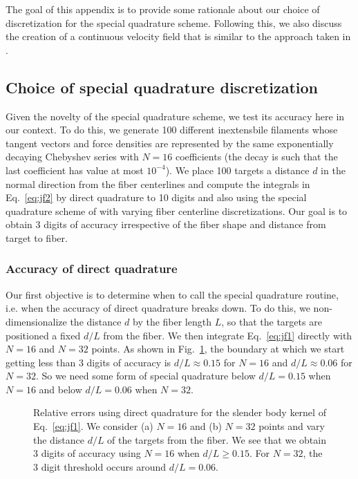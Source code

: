 The goal of this appendix is to provide some rationale about our choice of discretization for the special quadrature scheme. Following this, we also discuss the creation of a continuous velocity field that is similar to the approach taken in \cite{ts04}. 

\subsection{Choice of special quadrature discretization}
Given the novelty of the special quadrature scheme, we test its accuracy here in our context. To do this, we generate 100 different inextensbile filaments whose tangent vectors and force densities are represented by the same exponentially decaying Chebyshev series with $N=16$ coefficients (the decay is such that the last coefficient has value at most $10^{-4}$). We place 100 targets a distance $d$ in the normal direction from the fiber centerlines and compute the integrals in Eq.\ \eqref{eq:jf2} by direct quadrature to 10 digits and also using the special quadrature scheme of \cite{barLud} with varying fiber centerline discretizations. Our goal is to obtain 3 digits of accuracy irrespective of the fiber shape and distance from target to fiber. 

\subsubsection{Accuracy of direct quadrature}
Our first objective is to determine when to call the special quadrature routine, i.e. when the accuracy of direct quadrature breaks down. To do this, we non-dimensionalize the distance $d$ by the fiber length $L$, so that the targets are positioned a fixed $d/L$ from the fiber. We then integrate Eq.\ \eqref{eq:jf1} directly with $N=16$ and $N=32$ points. As shown in Fig.\ \ref{fig:dirquad}, the boundary at which we start getting less than 3 digits of accuracy is $d/L \approx 0.15$ for $N=16$ and $d/L \approx 0.06$ for $N=32$. So we need some form of special quadrature below $d/L=0.15$ when $N=16$ and below $d/L=0.06$ when $N=32$. 

\begin{figure}
\centering
{}
\caption{Relative errors using direct quadrature for the slender body kernel of Eq.\ \eqref{eq:jf1}. We consider (a) $N=16$ and (b) $N=32$ points and vary the distance $d/L$ of the targets from the fiber. We see that we obtain 3 digits of accuracy using $N=16$ when $d/L \geq 0.15$. For $N=32$, the 3 digit threshold occurs around $d/L = 0.06$. }
\label{fig:dirquad}
\end{figure}

